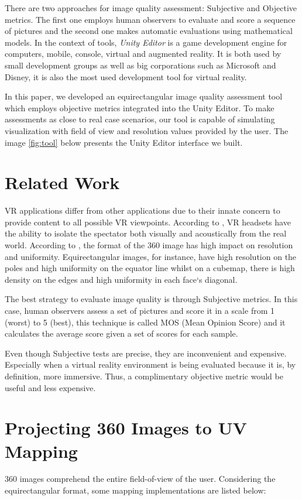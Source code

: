 \documentclass[12pt]{article}
\begin{document}
There are two approaches for image quality assessment: Subjective  and Objective metrics. The first one employs human observers to evaluate and score a sequence of pictures and the second one makes automatic evaluations using mathematical models. In the context of tools, \textit{Unity Editor} is a game development engine for computers, mobile, console, virtual and augmented reality. It is both used by small development groups as well as big corporations such as Microsoft and Disney, it is also the most used development tool for virtual reality.

In this paper, we developed an equirectangular image quality assessment tool which employs objective metrics integrated into the Unity Editor. To make assessments as close to real case scenarios, our tool is capable of simulating visualization with field of view and resolution values provided by the user. The image \ref{fig:tool} below presents the Unity Editor interface we built. 

\section{Related Work}
VR applications differ from other applications due to their innate concern to provide content to all possible VR viewpoints. According to \cite{fuchs2017virtual}, VR headsets have the ability to isolate the spectator both visually and acoustically from the real world.
According to \cite{dunn2017resolution}, the format of the 360 image has high impact on resolution and uniformity. Equirectangular images, for instance, have high resolution on the poles and high uniformity on the equator line whilst on a cubemap, there is high density on the edges and high uniformity in each face`s diagonal.

The best strategy to evaluate image quality is through Subjective metrics. In this case, human observers assess a set of pictures and score it in a scale from 1 (worst) to 5 (best), this technique is called MOS (Mean Opinion Score) and it calculates the average score given a set of scores for each sample.

Even though Subjective tests are precise, they are inconvenient and expensive. Especially when a virtual reality environment is being evaluated because it is, by definition, more immersive. Thus, a complimentary objective metric would be useful and less expensive.

\section{Projecting 360 Images to UV Mapping}
360 images comprehend the entire field-of-view of the user. Considering the equirectangular format, some mapping implementations are listed below:
\end{document}
